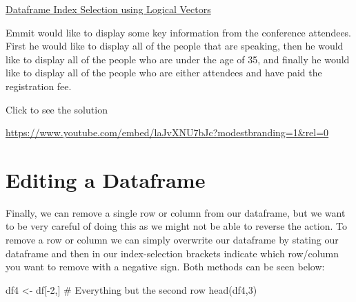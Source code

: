 \documentclass[
  letterpaper,
  DIV=11,
  numbers=noendperiod]{scrreprt}
\newenvironment{Shaded}{\begin{snugshade}}{\end{snugshade}}
\newcommand{\CommentTok}[1]{\textcolor[rgb]{0.37,0.37,0.37}{#1}}
\newcommand{\DecValTok}[1]{\textcolor[rgb]{0.68,0.00,0.00}{#1}}
\newcommand{\FunctionTok}[1]{\textcolor[rgb]{0.28,0.35,0.67}{#1}}
\newcommand{\NormalTok}[1]{\textcolor[rgb]{0.00,0.23,0.31}{#1}}
\newcommand{\OtherTok}[1]{\textcolor[rgb]{0.00,0.23,0.31}{#1}}
\newcommand{\SpecialCharTok}[1]{\textcolor[rgb]{0.37,0.37,0.37}{#1}}
\begin{document}
\begin{watch}{}{}
    \href{https://youtu.be/hksRGX-YT6w}{Dataframe Index Selection using Logical Vectors}
\end{watch}

\begin{tcolorbox}[enhanced jigsaw, leftrule=.75mm, arc=.35mm, coltitle=black, rightrule=.15mm, bottomrule=.15mm, toprule=.15mm, left=2mm, colbacktitle=quarto-callout-tip-color!10!white, title=\textcolor{quarto-callout-tip-color}{\faLightbulb}\hspace{0.5em}{Try it Out}, toptitle=1mm, breakable, colframe=quarto-callout-tip-color-frame, bottomtitle=1mm, titlerule=0mm, colback=white, opacityback=0, opacitybacktitle=0.6]

Emmit would like to display some key information from the conference
attendees. First he would like to display all of the people that are
speaking, then he would like to display all of the people who are under
the age of 35, and finally he would like to display all of the people
who are either attendees and have paid the registration fee.

Click to see the solution

\url{https://www.youtube.com/embed/laJvXNU7bJc?modestbranding=1&rel=0}

\end{tcolorbox}

\section{Editing a Dataframe}\label{editing-a-dataframe}

Finally, we can remove a single row or column from our dataframe, but we
want to be very careful of doing this as we might not be able to reverse
the action. To remove a row or column we can simply overwrite our
dataframe by stating our dataframe and then in our index-selection
brackets indicate which row/column you want to remove with a negative
sign. Both methods can be seen below:

\begin{Shaded}
\begin{Highlighting}[]
\NormalTok{df4 }\OtherTok{\textless{}{-}}\NormalTok{ df[}\SpecialCharTok{{-}}\DecValTok{2}\NormalTok{,] }\CommentTok{\# Everything but the second row}
\FunctionTok{head}\NormalTok{(df4,}\DecValTok{3}\NormalTok{)}
\end{Highlighting}
\end{Shaded}
\end{document}
